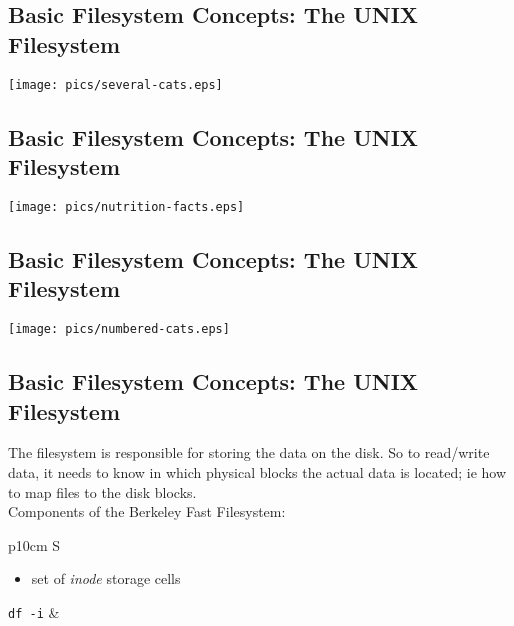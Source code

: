 \documentclass[xga]{xdvislides}
\begin{document}
\subsection{Basic Filesystem Concepts: The UNIX Filesystem}
\begin{center}
\texttt{[image: pics/several-cats.eps]} \\
\end{center}

\subsection{Basic Filesystem Concepts: The UNIX Filesystem}
\vspace*{\fill}
\begin{center}
\texttt{[image: pics/nutrition-facts.eps]} \\
\end{center}
\vspace*{\fill}

\subsection{Basic Filesystem Concepts: The UNIX Filesystem}
\vspace*{\fill}
\begin{center}
\texttt{[image: pics/numbered-cats.eps]}
\end{center}
\vspace*{\fill}

\subsection{Basic Filesystem Concepts: The UNIX Filesystem}
The filesystem is responsible for storing the data on the disk.
So to read/write data, it needs to know in which physical blocks the actual
data is located; ie how to map files to the disk blocks.
\\

Components of the Berkeley Fast Filesystem:
\\

\begin{tabular}{ p{10cm} S }
\begin{itemize}
	\item set of {\em inode} storage cells
\end{itemize}
{\tt df -i}
&  \\
\end{tabular}
\end{document}
